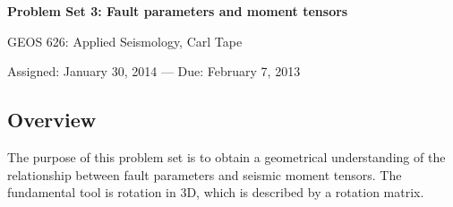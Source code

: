 \documentclass[11pt,titlepage,fleqn]{article}
\begin{document}

\begin{center}

{\large \bf Problem Set 3: Fault parameters and moment tensors}

GEOS 626: Applied Seismology, Carl Tape

Assigned: January 30, 2014 --- Due: February 7, 2013

\end{center}

\subsection*{Overview}

The purpose of this problem set is to obtain a geometrical understanding of the relationship between fault parameters and seismic moment tensors. The fundamental tool is rotation in 3D, which is described by a rotation matrix.
\end{document}
